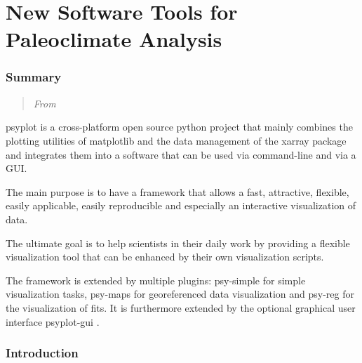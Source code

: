 
\part{New Software Tools for Paleoclimate Analysis}  \label{part:software}


\label{chp:psyplot}

\begin{refsection}


\section{Summary}  \label{sec:psyplot-joss}

\blockquote{
	\textit{From}
}

\noindent psyplot \citep{Sommer2017} is a cross-platform open source python project that mainly combines the plotting utilities of matplotlib \citep{Hunter2007} and the data management of the xarray \citep{HoyerHamman2017} package and integrates them into a software that can be used via command-line and via a GUI.

The main purpose is to have a framework that allows a fast, attractive, flexible, easily applicable, easily reproducible and especially an interactive visualization of data.
 
The ultimate goal is to help scientists in their daily work by providing a flexible visualization tool that can be enhanced by their own visualization scripts.

The framework is extended by multiple plugins: psy-simple \citep{Sommer2017b} for simple visualization tasks, psy-maps \citep{Sommer2017c} for georeferenced data visualization and psy-reg \citep{Sommer2017d} for the visualization of fits. It is furthermore extended by the optional graphical user interface psyplot-gui \citep{Sommer2017e}.


\section{Introduction}  \label{sec:psyplot-review}



\end{refsection}
